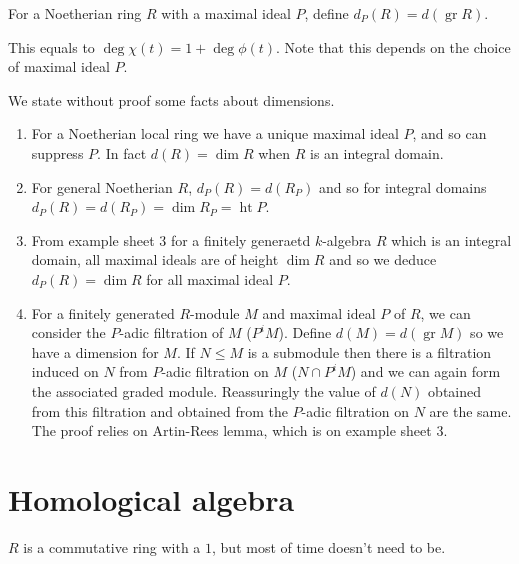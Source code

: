 \documentclass[a4paper]{article}
\DeclareMathOperator{\htt}{ht} %
\DeclareMathOperator{\gr}{gr} %
\begin{document}
\begin{definition}
  For a Noetherian ring \(R\) with a maximal ideal \(P\), define \(d_P(R) = d(\gr R)\).
\end{definition}

This equals to \(\deg \chi(t) = 1 + \deg \phi(t)\). Note that this depends on the choice of maximal ideal \(P\).

\begin{remark}
  We state without proof some facts about dimensions.
  \begin{enumerate}
  \item For a Noetherian local ring we have a unique maximal ideal \(P\), and so can suppress \(P\). In fact \(d(R) = \dim R\) when \(R\) is an integral domain.
  \item For general Noetherian \(R\), \(d_P(R) = d(R_P)\) and so for integral domains \(d_P(R) = d(R_P) = \dim R_P = \htt P\).
  \item From example sheet 3 for a finitely generaetd \(k\)-algebra \(R\) which is an integral domain, all maximal ideals are of height \(\dim R\) and so we deduce \(d_P(R) = \dim R\) for all maximal ideal \(P\).
  \item For a finitely generated \(R\)-module \(M\) and maximal ideal \(P\) of \(R\), we can consider the \(P\)-adic filtration of \(M\) (\(P^iM\)). Define \(d(M) = d(\gr M)\) so we have a dimension for \(M\). If \(N \leq M\) is a submodule then there is a filtration induced on \(N\) from \(P\)-adic filtration on \(M\) (\(N \cap P^iM\)) and we can again form the associated graded module. Reassuringly the value of \(d(N)\) obtained from this filtration and obtained from the \(P\)-adic filtration on \(N\) are the same. The proof relies on Artin-Rees lemma, which is on example sheet 3.
  \end{enumerate}
\end{remark}

\section{Homological algebra}

\(R\) is a commutative ring with a \(1\), but most of time doesn't need to be.
\end{document}

